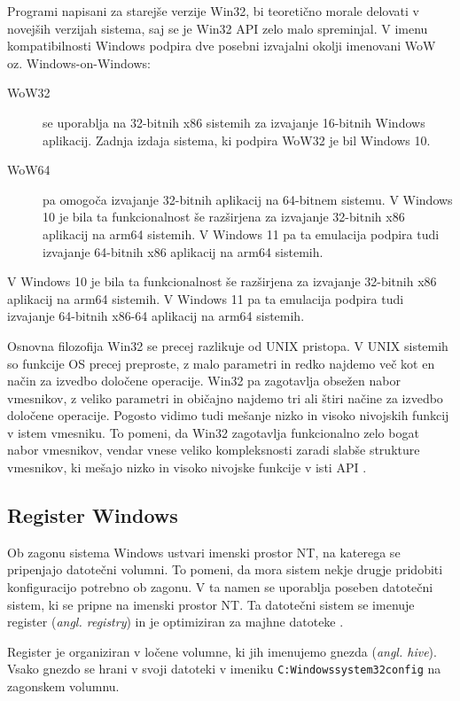 \documentclass[a4paper,12pt,openright]{book}
\begin{document}
Programi napisani za starejše verzije Win32, bi teoretično morale delovati v novejših verzijah sistema, saj se je Win32 API zelo malo spreminjal.
V imenu kompatibilnosti Windows podpira dve posebni izvajalni okolji imenovani WoW oz. Windows-on-Windows:
\begin{description}
	\item[WoW32] se uporablja na 32-bitnih x86 sistemih za izvajanje 16-bitnih Windows aplikacij. Zadnja izdaja sistema, ki podpira WoW32 je bil Windows 10.
	\item[WoW64] pa omogoča izvajanje 32-bitnih aplikacij na 64-bitnem sistemu.
	V Windows 10 je bila ta funkcionalnost še razširjena za izvajanje 32-bitnih x86 aplikacij na arm64 sistemih.
	V Windows 11 pa ta emulacija podpira tudi izvajanje 64-bitnih x86 aplikacij na arm64 sistemih.
\end{description}
V Windows 10 je bila ta funkcionalnost še razširjena za izvajanje 32-bitnih x86 aplikacij na arm64 sistemih.
V Windows 11 pa ta emulacija podpira tudi izvajanje 64-bitnih x86-64 aplikacij na arm64 sistemih.

Osnovna filozofija Win32 se precej razlikuje od UNIX pristopa.
V UNIX sistemih so funkcije OS precej preproste, z malo parametri in redko najdemo več kot en način za izvedbo določene operacije.
Win32 pa zagotavlja obsežen nabor vmesnikov, z veliko parametri in običajno najdemo tri ali štiri načine za izvedbo določene operacije.
Pogosto vidimo tudi mešanje nizko in visoko nivojskih funkcij v istem vmesniku.
To pomeni, da Win32 zagotavlja funkcionalno zelo bogat nabor vmesnikov, vendar vnese veliko kompleksnosti zaradi slabše strukture vmesnikov, ki mešajo nizko in visoko nivojske funkcije v isti API \cite{Tanenbaum_Bos_2023}.

\subsection{Register Windows}

Ob zagonu sistema Windows ustvari imenski prostor NT, na katerega se pripenjajo datotečni volumni.
To pomeni, da mora sistem nekje drugje pridobiti konfiguracijo potrebno ob zagonu.
V ta namen se uporablja poseben datotečni sistem, ki se pripne na imenski prostor NT.
Ta datotečni sistem se imenuje register (\textit{angl. registry}) in je optimiziran za majhne datoteke \cite{Tanenbaum_Bos_2023}.

Register je organiziran v ločene volumne, ki jih imenujemo gnezda (\textit{angl. hive}).
Vsako gnezdo se hrani v svoji datoteki v imeniku \texttt{C:Windowssystem32config} na zagonskem volumnu.
\end{document}
